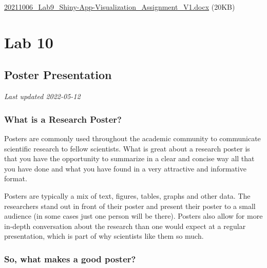 \documentclass[
]{book}
\begin{document}
\href{files/20211006_Lab9_Shiny-App-Visualization_Assignment_V1.docx}{20211006\_Lab9\_Shiny-App-Visualization\_Assignment\_V1.docx} (20KB)

\hypertarget{part-lab-10}{%
\part*{Lab 10}\label{part-lab-10}}

\hypertarget{poster-presentation}{%
\chapter*{Poster Presentation}\label{poster-presentation}}

\emph{Last updated 2022-05-12}

\hypertarget{what-is-a-research-poster}{%
\section*{What is a Research Poster?}\label{what-is-a-research-poster}}

Posters are commonly used throughout the academic community to communicate scientific research to fellow scientists. What is great about a research poster is that you have the opportunity to summarize in a clear and concise way all that you have done and what you have found in a very attractive and informative format.

Posters are typically a mix of text, figures, tables, graphs and other data. The researchers stand out in front of their poster and present their poster to a small audience (in some cases just one person will be there). Posters also allow for more in-depth conversation about the research than one would expect at a regular presentation, which is part of why scientists like them so much.

\hypertarget{so-what-makes-a-good-poster}{%
\section*{So, what makes a good poster?}\label{so-what-makes-a-good-poster}}
\end{document}
